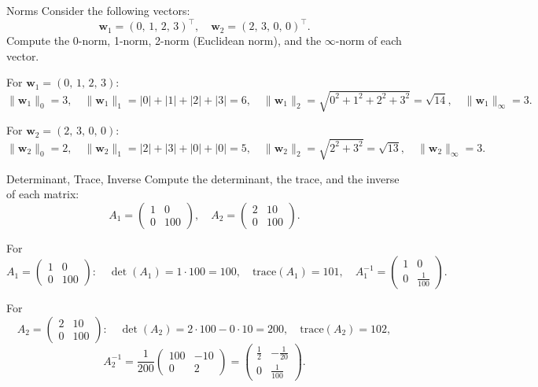 \documentclass{article}
\author{Leopold Lemmermann}
\begin{document}
\createtitle


\begin{exercise}{Norms}
  Consider the following vectors:
  \[
    \mathbf{w}_1 = (0,\,1,\,2,\,3)^\top, 
    \quad 
    \mathbf{w}_2 = (2,\,3,\,0,\,0)^\top.
  \]
  Compute the 0-norm, 1-norm, 2-norm (Euclidean norm), and the $\infty$-norm of each vector.
  
  \begin{solution}
    For $\mathbf{w}_1 = (0,\,1,\,2,\,3)$:
    \[
      \|\mathbf{w}_1\|_0 = 3,\quad
      \|\mathbf{w}_1\|_1 = |0| + |1| + |2| + |3| = 6,\quad
      \|\mathbf{w}_1\|_2 = \sqrt{0^2 + 1^2 + 2^2 + 3^2} = \sqrt{14},\quad
      \|\mathbf{w}_1\|_\infty = 3.
    \]

    For $\mathbf{w}_2 = (2,\,3,\,0,\,0)$:
    \[
      \|\mathbf{w}_2\|_0 = 2,\quad
      \|\mathbf{w}_2\|_1 = |2| + |3| + |0| + |0| = 5,\quad
      \|\mathbf{w}_2\|_2 = \sqrt{2^2 + 3^2} = \sqrt{13},\quad
      \|\mathbf{w}_2\|_\infty = 3.
    \]
  \end{solution}
\end{exercise}

\begin{exercise}{Determinant, Trace, Inverse}
  Compute the determinant, the trace, and the inverse of each matrix:
  \[
    A_1 = \begin{pmatrix} 1 & 0 \\ 0 & 100 \end{pmatrix},
    \quad
    A_2 = \begin{pmatrix} 2 & 10 \\ 0 & 100 \end{pmatrix}.
  \]
  
  \begin{solution}
    For 
    \[
      A_1 = \begin{pmatrix} 1 & 0 \\ 0 & 100 \end{pmatrix}:
      \quad
      \det(A_1) = 1 \cdot 100 = 100, 
      \quad
      \mathrm{trace}(A_1) = 101, 
      \quad
      A_1^{-1} = \begin{pmatrix} 1 & 0 \\[4pt] 0 & \tfrac{1}{100} \end{pmatrix}.
    \]

    For 
    \[
      A_2 = \begin{pmatrix} 2 & 10 \\ 0 & 100 \end{pmatrix}:
      \quad
      \det(A_2) = 2 \cdot 100 - 0 \cdot 10 = 200,
      \quad
      \mathrm{trace}(A_2) = 102,
    \]
    \[
      A_2^{-1}
      = \frac{1}{200} 
      \begin{pmatrix}
        100 & -10 \\[3pt]
        0   & 2
      \end{pmatrix}
      = \begin{pmatrix}
        \tfrac{1}{2} & -\tfrac{1}{20} \\[3pt]
        0            & \tfrac{1}{100}
      \end{pmatrix}.
    \]
  \end{solution}
\end{exercise}
\end{document}
